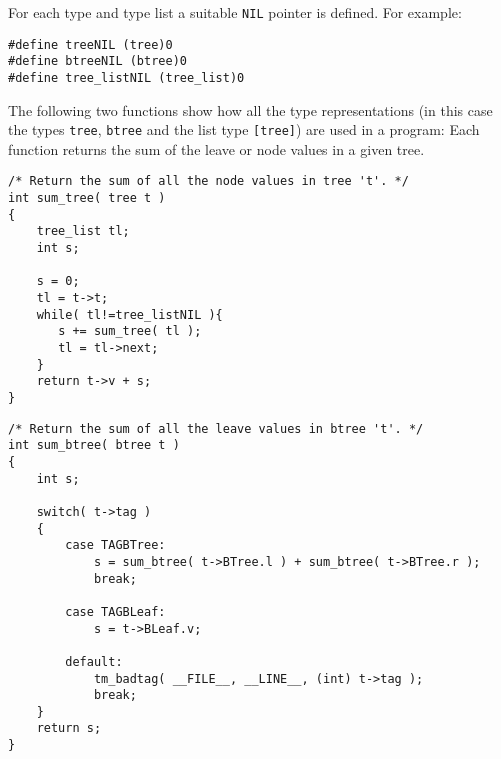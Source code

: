 \par
For each type and type list a suitable {\tt NIL} pointer is defined.
For example:
\begin{verbatim}
#define treeNIL (tree)0
#define btreeNIL (btree)0
#define tree_listNIL (tree_list)0
\end{verbatim}
The following two functions show how all the type representations
(in this case the types {\tt tree}, {\tt btree} and the list type
\verb+[tree]+)
are used in a program:
Each function returns the sum of the leave or node values in a given
tree.
\begin{verbatim}
/* Return the sum of all the node values in tree 't'. */
int sum_tree( tree t )
{
    tree_list tl;
    int s;

    s = 0;
    tl = t->t;
    while( tl!=tree_listNIL ){
       s += sum_tree( tl );
       tl = tl->next;
    }
    return t->v + s;
}
\end{verbatim}

\begin{verbatim}
/* Return the sum of all the leave values in btree 't'. */
int sum_btree( btree t )
{
    int s;

    switch( t->tag )
    {
        case TAGBTree:
            s = sum_btree( t->BTree.l ) + sum_btree( t->BTree.r );
            break;

        case TAGBLeaf:
            s = t->BLeaf.v;

        default:
            tm_badtag( __FILE__, __LINE__, (int) t->tag );
            break;
    }
    return s;
}
\end{verbatim}
